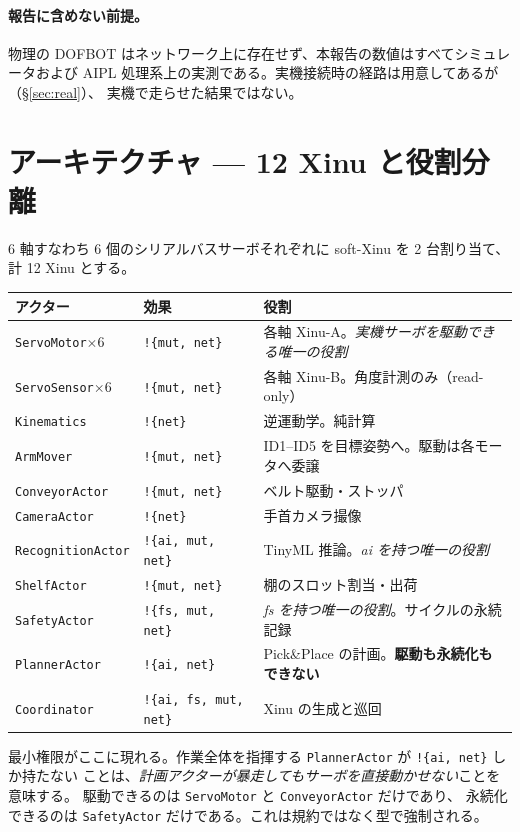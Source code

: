 \documentclass[11pt,a4paper]{article}
\newcommand{\eff}[1]{\texttt{!\{#1\}}}
\begin{document}
\paragraph{報告に含めない前提。}
物理の DOFBOT はネットワーク上に存在せず、本報告の数値はすべてシミュレータおよび
AIPL 処理系上の実測である。実機接続時の経路は用意してあるが（\S\ref{sec:real}）、
実機で走らせた結果ではない。

\section{アーキテクチャ --- 12 Xinu と役割分離}

6 軸すなわち 6 個のシリアルバスサーボそれぞれに soft-Xinu を 2 台割り当て、計 12 Xinu とする。

\begin{center}
\small
\begin{tabularx}{\textwidth}{@{}l l >{\raggedright\arraybackslash}X@{}}
\toprule
\textbf{アクター} & \textbf{効果} & \textbf{役割} \\
\midrule
\texttt{ServoMotor}$\times$6 & \eff{mut, net} & 各軸 Xinu-A。\emph{実機サーボを駆動できる唯一の役割} \\
\texttt{ServoSensor}$\times$6 & \eff{mut, net} & 各軸 Xinu-B。角度計測のみ（read-only） \\
\texttt{Kinematics} & \eff{net} & 逆運動学。純計算 \\
\texttt{ArmMover} & \eff{mut, net} & ID1--ID5 を目標姿勢へ。駆動は各モータへ委譲 \\
\texttt{ConveyorActor} & \eff{mut, net} & ベルト駆動・ストッパ \\
\texttt{CameraActor} & \eff{net} & 手首カメラ撮像 \\
\texttt{RecognitionActor} & \eff{ai, mut, net} & TinyML 推論。\emph{ai を持つ唯一の役割} \\
\texttt{ShelfActor} & \eff{mut, net} & 棚のスロット割当・出荷 \\
\texttt{SafetyActor} & \eff{fs, mut, net} & \emph{fs を持つ唯一の役割}。サイクルの永続記録 \\
\texttt{PlannerActor} & \eff{ai, net} & Pick\&Place の計画。\textbf{駆動も永続化もできない} \\
\texttt{Coordinator} & \eff{ai, fs, mut, net} & 12 Xinu の生成と巡回 \\
\bottomrule
\end{tabularx}
\end{center}

\noindent
最小権限がここに現れる。作業全体を指揮する \texttt{PlannerActor} が \eff{ai, net} しか持たない
ことは、\emph{計画アクターが暴走してもサーボを直接動かせない}ことを意味する。
駆動できるのは \texttt{ServoMotor} と \texttt{ConveyorActor} だけであり、
永続化できるのは \texttt{SafetyActor} だけである。これは規約ではなく型で強制される。
\end{document}
